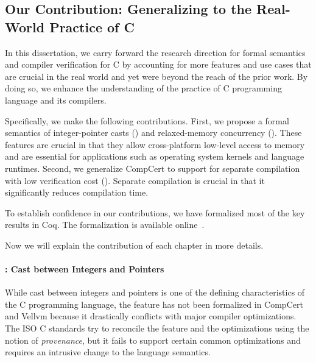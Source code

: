 \subsection{Our Contribution: Generalizing to the Real-World Practice of C}

In this dissertation, we carry forward the research direction for formal semantics and compiler
verification for C by accounting for more features and use cases that are crucial in the real world
and yet were beyond the reach of the prior work.  By doing so, we enhance the understanding of the
practice of C programming language and its compilers.

Specifically, we make the following contributions.  First, we propose a formal semantics of
integer-pointer casts () and relaxed-memory concurrency ().
These features are crucial in that they allow cross-platform low-level access to memory and are
essential for applications such as operating system kernels and language runtimes.  Second, we
generalize CompCert to support for separate compilation with low verification cost
().  Separate compilation is crucial in that it significantly reduces compilation
time.

To establish confidence in our contributions, we have formalized most of the key results in Coq.
The formalization is available online~\cite{kang-phd-thesis-web}.

Now we will explain the contribution of each chapter in more details.




\paragraph{: Cast between Integers and Pointers}

While cast between integers and pointers is one of the defining characteristics of the C programming
language, the feature has not been formalized in CompCert and Vellvm because it drastically
conflicts with major compiler optimizations.  The ISO C standards try to reconcile the feature and
the optimizations using the notion of \emph{provenance}, but it fails to support certain common
optimizations and requires an intrusive change to the language semantics.

